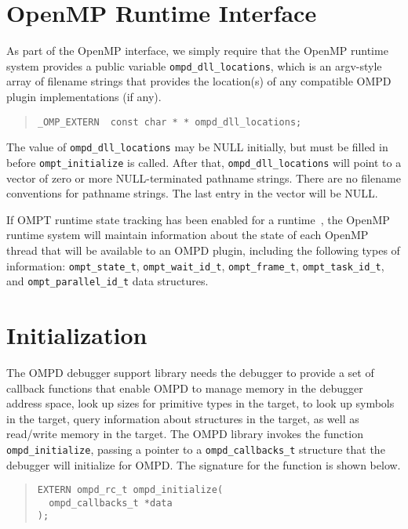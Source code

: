 \documentclass{article}
\begin{document}
\section{OpenMP Runtime Interface}

As part of the OpenMP interface, we simply require that 
 the OpenMP runtime system provides a public variable \verb|ompd_dll_locations|, which is an argv-style array of filename strings that provides the location(s) of any compatible OMPD plugin implementations (if any).

\begin{quote}
\begin{verbatim}
_OMP_EXTERN  const char * * ompd_dll_locations;
\end{verbatim}
\end{quote}

\noindent
The value of \verb|ompd_dll_locations| may be NULL initially, but must be filled in before \verb|ompt_initialize| is called. After that, \verb|ompd_dll_locations|  will point to a vector of zero or more NULL-terminated pathname strings. There are no filename conventions for pathname strings. The last entry in the vector will be NULL. 

If OMPT runtime state tracking has been enabled for a runtime~\cite{ompt-tr2}, the OpenMP runtime system will maintain 
information about the state of each OpenMP thread that will be available to an OMPD plugin, including the following types of information:
\verb|ompt_state_t|, \verb|ompt_wait_id_t|, \verb|ompt_frame_t|, \verb|ompt_task_id_t|, and \verb|ompt_parallel_id_t| data structures.




\section{Initialization}

The OMPD debugger support library needs the debugger to provide a set of callback functions that enable  OMPD to manage memory in the debugger address space, look up sizes for primitive types in the target,  to look up symbols in the target, query information about structures in the target, as well as read/write memory in the target.  The OMPD library invokes the function \verb|ompd_initialize|, passing a pointer to a \verb|ompd_callbacks_t| structure that the debugger will initialize for OMPD. The signature for the function is shown below. 

\begin{quote}
\begin{verbatim}
EXTERN ompd_rc_t ompd_initialize(
  ompd_callbacks_t *data
);
\end{verbatim}
\end{quote}
\end{document}
